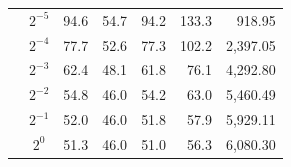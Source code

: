 \begin{table}[H]
\begin{tabular}{ccrrrrr}
 & $2^{-5}$ & 94.6 & 54.7 & 94.2 & 133.3 & 918.95 \\
 & $2^{-4}$ & 77.7 & 52.6 & 77.3 & 102.2 & 2,397.05 \\
 & $2^{-3}$ & 62.4 & 48.1 & 61.8 & 76.1 & 4,292.80 \\
 & $2^{-2}$ & 54.8 & 46.0 & 54.2 & 63.0 & 5,460.49 \\
 & $2^{-1}$ & 52.0 & 46.0 & 51.8 & 57.9 & 5,929.11 \\
 & $2^{0}$ & 51.3 & 46.0 & 51.0 & 56.3 & 6,080.30 \\
        \bottomrule
    \end{tabular}
\end{table}